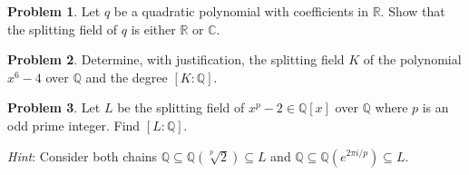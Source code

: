 \documentclass[11pt]{article}
\newcommand{\C}{\mathbb{C}}
\newcommand{\Q}{\mathbb{Q}}
\newcommand{\R}{\mathbb{R}}
\theoremstyle{definition}
\newtheorem{problem}{Problem}
\begin{document}
\begin{problem}
	Let $q$ be a quadratic polynomial with coefficients in $\R$. Show that the splitting field of $q$ is either $\R$ or $\C$.
\end{problem}



\begin{problem}
	Determine, with justification, the splitting field $K$ of the polynomial $x^6 -4$ over $\Q$ and the degree $[K : \Q]$.
\end{problem}	


\begin{problem}
Let $L$ be the splitting field of $x^p -2 \in \Q[x]$ over $\Q$ where $p$ is an odd prime integer. Find $[L: \Q]$.

\noindent
{\em Hint}: Consider both chains $\Q \subseteq \Q(\sqrt[p]{2}) \subseteq L$ and $\Q \subseteq \Q(e^{2 \pi i/p}) \subseteq L$.
\end{problem}
\end{document}
